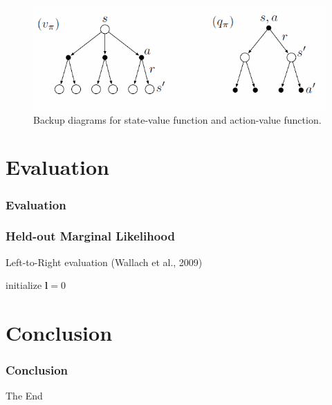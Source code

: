 \documentclass{beamer}
\begin{document}
    \begin{frame}
        \begin{figure}[ht]
            \centering
            \includegraphics[width=\linewidth]{./images/backup_diagrams.PNG}
            \caption{Backup diagrams for state-value function and action-value function.}
            \label{fig:backup_diagrams}
        \end{figure}
    \end{frame}

    \section{Evaluation}

    \begin{frame}
        \frametitle{Evaluation}
    \end{frame}

    \begin{frame}
        \frametitle{Held-out Marginal Likelihood}
        Left-to-Right evaluation (Wallach et al., 2009)
        \newline

        \begin{algorithm}[H]
            initialize $\mathbf{l} = 0$ \\
        \end{algorithm}
    \end{frame}

    \section{Conclusion}

    \begin{frame}
        \frametitle{Conclusion}

    \end{frame}

    \begin{frame}
        \Huge{\centerline{The End}}
    \end{frame}
\end{document}
